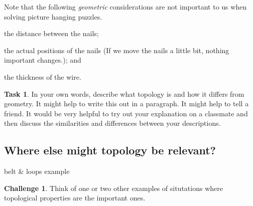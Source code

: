 \documentclass[12pt,letterpaper]{article}
\theoremstyle{definition}
\newtheorem*{challenge}{Challenge}
\newtheorem{task}{Task}
\begin{document}
Note that the following \emph{geometric} considerations are not important to us when solving picture hanging puzzles.
\begin{compactenum}
\item the distance between the nails;
\item the actual positions of the nails (If we move the nails a little bit, nothing important changes.); and
\item the thickness of the wire.
\end{compactenum}

\begin{task}
In your own words, describe what topology is and how it differs from geometry.
It might help to write this out in a paragraph.
It might help to tell a friend.
It would be very helpful to try out your explanation on a classmate and then discuss the similarities and differences between your descriptions.
\end{task}

\subsection*{Where else might topology be relevant?}

belt \& loops example

\begin{challenge}
Think of one or two other examples of situtations where topological properties are the important ones.
\end{challenge}




\end{document}
